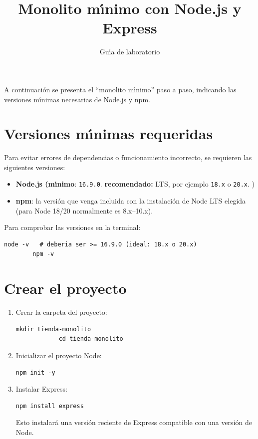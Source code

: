 \documentclass[11pt,a4paper]{article}
\title{Monolito m\'{\i}nimo con Node.js y Express}
\author{Gu\'{\i}a de laboratorio}
\date{}
\begin{document}
	
	\maketitle
	
	A continuación se presenta el ``monolito m\'{\i}nimo'' paso a paso, indicando las versiones m\'{\i}nimas necesarias de Node.js y npm.
	
	\section{Versiones m\'{\i}nimas requeridas}
	
	Para evitar errores de dependencias o funcionamiento incorrecto, se requieren las siguientes versiones:
	
	\begin{itemize}
		\item \textbf{Node.js (m\'{\i}nimo}: \texttt{16.9.0}. \textbf{recomendado:} LTS, por ejemplo \texttt{18.x} o \texttt{20.x}. )
		\item \textbf{npm}: la versi\'on que venga incluida con la instalaci\'on de Node LTS elegida (para Node 18/20 normalmente es 8.x--10.x).
	\end{itemize}
	
	Para comprobar las versiones en la terminal:
	
	\begin{lstlisting}[style=terminalstyle]
		node -v   # deberia ser >= 16.9.0 (ideal: 18.x o 20.x)
		npm -v
	\end{lstlisting}
	
	\section{Crear el proyecto}
	
	\begin{enumerate}
		\item Crear la carpeta del proyecto:
		
		\begin{lstlisting}[style=terminalstyle]
			mkdir tienda-monolito
			cd tienda-monolito
		\end{lstlisting}
		
		\item Inicializar el proyecto Node:
		
		\begin{lstlisting}[style=terminalstyle]
			npm init -y
		\end{lstlisting}
		
		\item Instalar Express:
		
		\begin{lstlisting}[style=terminalstyle]
			npm install express
		\end{lstlisting}
		
		Esto instalar\'a una versi\'on reciente de Express compatible con una versi\'on de Node. 
	\end{enumerate}
	
\end{document}

